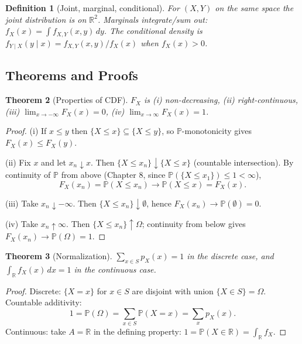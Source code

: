 \documentclass[11pt]{article}
\newtheorem{theorem}{Theorem}[section]
\newtheorem{definition}[theorem]{Definition}
\theoremstyle{remark}
\begin{document}
\begin{definition}[Joint, marginal, conditional]
For $(X,Y)$ on the same space the \emph{joint} distribution is on $\mathbb{R}^2$. \emph{Marginals} integrate/sum out: $f_X(x) = \int f_{X,Y}(x,y)\, dy$. The \emph{conditional} density is $f_{Y\mid X}(y\mid x) = f_{X,Y}(x,y)/f_X(x)$ when $f_X(x) > 0$.
\end{definition}

\subsection*{Theorems and Proofs}

\begin{theorem}[Properties of CDF]
$F_X$ is (i) non-decreasing, (ii) right-continuous, (iii) $\lim_{x\to -\infty} F_X(x) = 0$, (iv) $\lim_{x\to\infty} F_X(x) = 1$.
\end{theorem}

\begin{proof}
(i) If $x \leq y$ then $\{X \leq x\} \subseteq \{X \leq y\}$, so $\mathbb{P}$-monotonicity gives $F_X(x) \leq F_X(y)$.

(ii) Fix $x$ and let $x_n \downarrow x$. Then $\{X \leq x_n\} \downarrow \{X \leq x\}$ (countable intersection). By continuity of $\mathbb{P}$ from above (Chapter 8, since $\mathbb{P}(\{X\leq x_1\}) \leq 1 < \infty$),
\[
F_X(x_n) = \mathbb{P}(X \leq x_n) \to \mathbb{P}(X \leq x) = F_X(x).
\]

(iii) Take $x_n \downarrow -\infty$. Then $\{X \leq x_n\} \downarrow \emptyset$, hence $F_X(x_n) \to \mathbb{P}(\emptyset) = 0$.

(iv) Take $x_n \uparrow \infty$. Then $\{X \leq x_n\} \uparrow \Omega$; continuity from below gives $F_X(x_n) \to \mathbb{P}(\Omega) = 1$.
\end{proof}

\begin{theorem}[Normalization]
$\sum_{x \in S} p_X(x) = 1$ in the discrete case, and $\int_{\mathbb{R}} f_X(x)\,dx = 1$ in the continuous case.
\end{theorem}

\begin{proof}
Discrete: $\{X = x\}$ for $x \in S$ are disjoint with union $\{X \in S\} = \Omega$. Countable additivity:
\[
1 = \mathbb{P}(\Omega) = \sum_{x \in S} \mathbb{P}(X = x) = \sum_x p_X(x).
\]
Continuous: take $A = \mathbb{R}$ in the defining property: $1 = \mathbb{P}(X \in \mathbb{R}) = \int_\mathbb{R} f_X$.
\end{proof}
\end{document}
